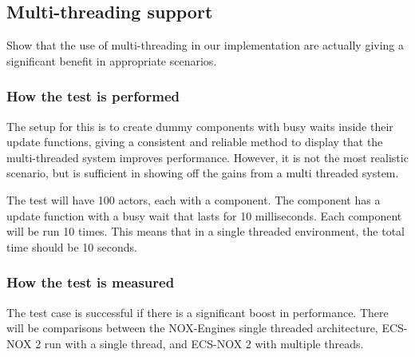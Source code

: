 \subsection{Multi-threading support}
Show that the use of multi-threading in our implementation are actually giving a significant benefit in appropriate scenarios.

\subsubsection*{How the test is performed}
The setup for this is to create dummy components with busy waits inside their update functions, giving a consistent and reliable method to display that the multi-threaded system improves performance. However, it is not the most realistic scenario, but is sufficient in showing off the gains from a multi threaded system.

The test will have 100 actors, each with a component.
The component has a update function with a busy wait that lasts for 10 milliseconds.
Each component will be run 10 times.
This means that in a single threaded environment, the total time should be 10 seconds.

\subsubsection*{How the test is measured}
The test case is successful if there is a significant boost in performance.
There will be comparisons between the NOX-Engines single threaded architecture, ECS-NOX 2 run with a single thread, and ECS-NOX 2 with multiple threads.

